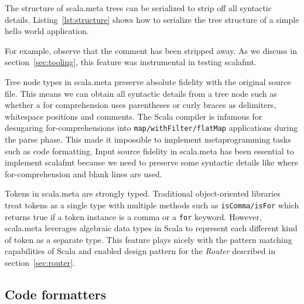 The structure of scala.meta trees can be serialized to strip off all syntactic details.
Listing~\ref{lst:structure} shows how to serialize the tree structure of a simple hello world application.

For example, observe that the comment has been stripped away.
As we discuss in section~\ref{sec:tooling}, this feature was instrumental in testing scalafmt.

Tree node types in scala.meta preserve absolute fidelity with the original source file.
This means we can obtain all syntactic details from a tree node such as whether a for comprehension uses parentheses or curly braces as delimiters, whitespace positions and comments.
The Scala compiler is infamous for desugaring for-comprehensions into \texttt{map/withFilter/flatMap} applications during the parse phase.
This made it impossible to implement metaprogramming tasks such as code formatting.
Input source fidelity in scala.meta has been essential to implement scalafmt because we need to preserve some syntactic details like where for-comprehension and blank lines are used.

Tokens in scala.meta are strongly typed.
Traditional object-oriented libraries treat tokens as a single type with multiple methods such as \texttt{isComma/isFor} which returns true if a token instance is a comma or a \texttt{for} keyword.
However, scala.meta leverages algebraic data types in Scala to represent each different kind of token as a separate type.
This feature plays nicely with the pattern matching capabilities of Scala and enabled design pattern for the \emph{Router} described in section~\ref{sec:router}.



\subsection{Code formatters}
%

